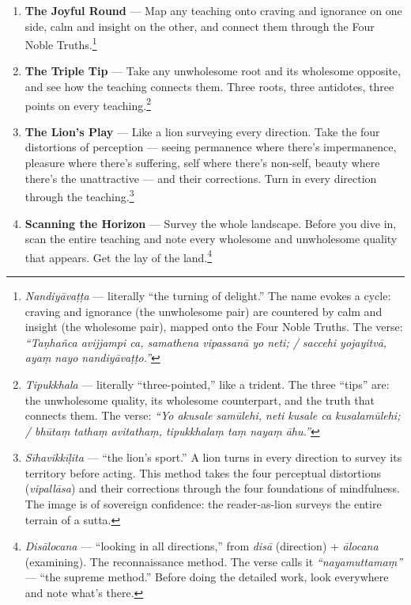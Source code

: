 \begin{enumerate}[leftmargin=*, itemsep=8pt]
\item \textbf{The Joyful Round} --- Map any teaching onto craving and ignorance on one side, calm and insight on the other, and connect them through the Four Noble Truths.\footnote{\textit{Nandiyāvaṭṭa} --- literally ``the turning of delight.'' The name evokes a cycle: craving and ignorance (the unwholesome pair) are countered by calm and insight (the wholesome pair), mapped onto the Four Noble Truths. The verse: \textit{``Taṇhañca avijjampi ca, samathena vipassanā yo neti; / saccehi yojayitvā, ayaṃ nayo nandiyāvaṭṭo.''}}

\item \textbf{The Triple Tip} --- Take any unwholesome root and its wholesome opposite, and see how the teaching connects them. Three roots, three antidotes, three points on every teaching.\footnote{\textit{Tipukkhala} --- literally ``three-pointed,'' like a trident. The three ``tips'' are: the unwholesome quality, its wholesome counterpart, and the truth that connects them. The verse: \textit{``Yo akusale samūlehi, neti kusale ca kusalamūlehi; / bhūtaṃ tathaṃ avitathaṃ, tipukkhalaṃ taṃ nayaṃ āhu.''}}

\item \textbf{The Lion's Play} --- Like a lion surveying every direction. Take the four distortions of perception --- seeing permanence where there's impermanence, pleasure where there's suffering, self where there's non-self, beauty where there's the unattractive --- and their corrections. Turn in every direction through the teaching.\footnote{\textit{Sīhavikkīḷita} --- ``the lion's sport.'' A lion turns in every direction to survey its territory before acting. This method takes the four perceptual distortions (\textit{vipallāsa}) and their corrections through the four foundations of mindfulness. The image is of sovereign confidence: the reader-as-lion surveys the entire terrain of a sutta.}

\item \textbf{Scanning the Horizon} --- Survey the whole landscape. Before you dive in, scan the entire teaching and note every wholesome and unwholesome quality that appears. Get the lay of the land.\footnote{\textit{Disālocana} --- ``looking in all directions,'' from \textit{disā} (direction) + \textit{ālocana} (examining). The reconnaissance method. The verse calls it \textit{``nayamuttamaṃ''} --- ``the supreme method.'' Before doing the detailed work, look everywhere and note what's there.}


\end{enumerate}
